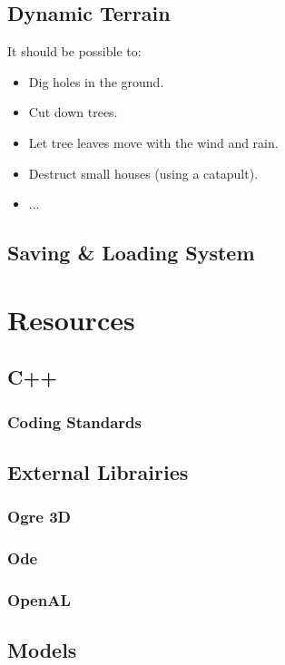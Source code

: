 \documentclass[a4paper]{report}
\begin{document}
	\chapter{Dynamic Terrain}

		It should be possible to:
		\begin{itemize}
			\item Dig holes in the ground.
			\item Cut down trees.
			\item Let tree leaves move with the wind and rain.
			\item Destruct small houses (using a catapult).
			\item ...
		\end{itemize}

	\chapter{Saving \& Loading System}

\part{Resources}

	\chapter{C++}

		\section{Coding Standards}

	\chapter{External Librairies}

		\section{Ogre 3D}

		\section{Ode}

		\section{OpenAL}

	\chapter{Models}
\end{document}
